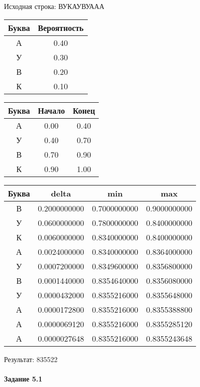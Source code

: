 \documentclass[a4paper, 12pt]{article}
\begin{document}
Исходная строка: ВУКАУВУААА\
\begin{center}
 \begin{tabular}{ |c|c| } 
  \hline
     Буква & Вероятность \\ \hline
А & 0.40\\\hline
У & 0.30\\\hline
В & 0.20\\\hline
К & 0.10
\\ \hline \end{tabular}
\end{center}
\begin{center}
 \begin{tabular}{ |c|c|c| } 
  \hline
     Буква & Начало & Конец \\ \hline
А & 0.00 & 0.40\\\hline
У & 0.40 & 0.70\\\hline
В & 0.70 & 0.90\\\hline
К & 0.90 & 1.00
\\ \hline \end{tabular}
\end{center}
\begin{center}
 \begin{tabular}{ |c|c|c|c| } 
  \hline
     Буква & delta & min & max \\ \hline
В & 0.2000000000 & 0.7000000000 & 0.9000000000\\\hline
У & 0.0600000000 & 0.7800000000 & 0.8400000000\\\hline
К & 0.0060000000 & 0.8340000000 & 0.8400000000\\\hline
А & 0.0024000000 & 0.8340000000 & 0.8364000000\\\hline
У & 0.0007200000 & 0.8349600000 & 0.8356800000\\\hline
В & 0.0001440000 & 0.8354640000 & 0.8356080000\\\hline
У & 0.0000432000 & 0.8355216000 & 0.8355648000\\\hline
А & 0.0000172800 & 0.8355216000 & 0.8355388800\\\hline
А & 0.0000069120 & 0.8355216000 & 0.8355285120\\\hline
А & 0.0000027648 & 0.8355216000 & 0.8355243648
\\ \hline \end{tabular}
\end{center}
Результат: 835522
\pagebreak
\paragraph{Задание 5.1}
\end{document}
